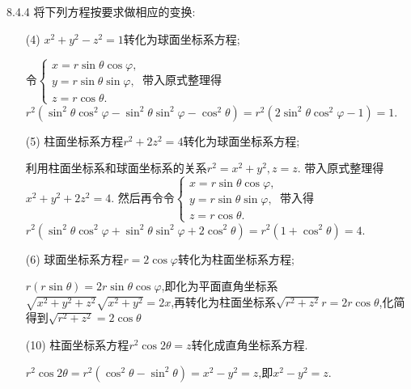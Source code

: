 \begin{exercise}{8.4.4}
    将下列方程按要求做相应的变换:
    \begin{enumerate}
        \item[(4)]$x^2+y^2-z^2=1$转化为球面坐标系方程;
        \begin{solution}
            令$\begin{cases}
                x=r\sin\theta\cos\varphi,\\
                y=r\sin\theta\sin\varphi,\\
                z=r\cos\theta.
            \end{cases}$带入原式整理得$r^2(\sin^2\theta\cos^2\varphi-\sin^2\theta\sin^2\varphi-\cos^2\theta)=r^2(2\sin^2\theta\cos^2\varphi-1)=1$.
        \end{solution}

        \item[(5)]柱面坐标系方程$r^2+2z^2=4$转化为球面坐标系方程;
        \begin{solution}
            利用柱面坐标系和球面坐标系的关系$r^2=x^2+y^2,z=z$.
            带入原式整理得$x^2+y^2+2z^2=4$.
            然后再令令$\begin{cases}
                x=r\sin\theta\cos\varphi,\\
                y=r\sin\theta\sin\varphi,\\
                z=r\cos\theta.
            \end{cases}$带入得$r^2(\sin^2\theta\cos^2\varphi+\sin^2\theta\sin^2\varphi+2\cos^2\theta)=r^2(1+\cos^2\theta)=4$.
        \end{solution}

        \item[(6)]球面坐标系方程$r=2\cos\varphi$转化为柱面坐标系方程;
        \begin{solution}
            $r(r\sin\theta)=2r\sin\theta\cos\varphi$,即化为平面直角坐标系$\sqrt{x^2+y^2+z^2}\sqrt{x^2+y^2}=2x$,再转化为柱面坐标系$\sqrt{r^2+z^2}r=2r\cos\theta$,化简得到$\sqrt{r^2+z^2}=2\cos\theta$
        \end{solution}
        
        \item[(10)]柱面坐标系方程$r^2\cos 2\theta=z$转化成直角坐标系方程.
        \begin{solution}
            $r^2\cos 2\theta=r^2(\cos^2\theta-\sin^2\theta)=x^2-y^2=z$,即$x^2-y^2=z$.
        \end{solution} 
    \end{enumerate}
\end{exercise}

